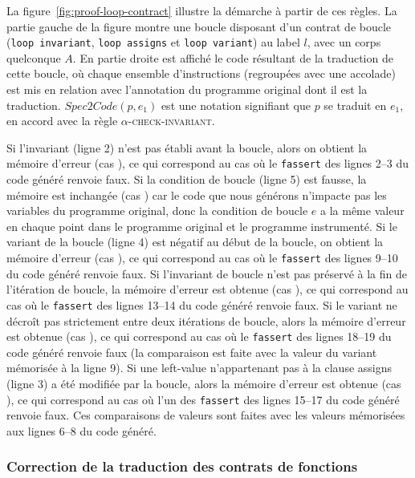 La figure~\ref{fig:proof-loop-contract} illustre la démarche à partir de ces
règles.
La partie gauche de la figure montre une boucle disposant d'un contrat de boucle
(\lstinline'loop invariant', \lstinline'loop assigns' et
\lstinline'loop variant') au label $l$, avec un corps quelconque $A$.
En partie droite est affiché le code résultant de la traduction de cette
boucle, où chaque ensemble d'instructions (regroupées avec une accolade) est
mis en relation avec l'annotation du programme original dont il est la
traduction.
$\mathit{Spec2Code}(p, e_1)$ est une notation signifiant que $p$ se traduit en
$e_1$, en accord avec la règle \textsc{$\alpha$-check-invariant}.

Si l'invariant (ligne 2) n'est pas établi avant la boucle, alors on obtient
la mémoire d'erreur (cas ), ce qui correspond au cas où le
\lstinline'fassert' des lignes 2--3 du code généré renvoie faux.
Si la condition de boucle (ligne 5) est fausse, la mémoire est inchangée
(cas ) car le code que nous générons n'impacte pas les
variables du programme original, donc la condition de boucle $e$ a la
même valeur en chaque point dans le programme original et le programme
instrumenté.
Si le variant de la boucle (ligne 4) est négatif au début de la boucle, on
obtient la mémoire d'erreur (cas ), ce qui correspond au cas
où le \lstinline'fassert' des lignes 9--10 du code généré renvoie faux.
Si l'invariant de boucle n'est pas préservé à la fin de l'itération de boucle,
la mémoire d'erreur est obtenue (cas ), ce qui
correspond au cas où le \lstinline'fassert' des lignes 13--14 du code généré
renvoie faux.
Si le variant ne décroît pas strictement entre deux itérations de boucle, alors
la mémoire d'erreur est obtenue (cas ), ce qui
correspond au cas où le \lstinline'fassert' des lignes 18--19 du code généré
renvoie faux (la comparaison est faite avec la valeur du variant mémorisée à la
ligne 9).
Si une left-value n'appartenant pas à la clause assigns (ligne 3) a été modifiée
par la boucle, alors la mémoire d'erreur est obtenue (cas ),
ce qui correspond au cas où l'un des \lstinline'fassert' des lignes 15--17 du
code généré renvoie faux.
Ces comparaisons de valeurs sont faites avec les valeurs mémorisées aux lignes
6--8 du code généré.




\subsubsection{Correction de la traduction des contrats de fonctions}


